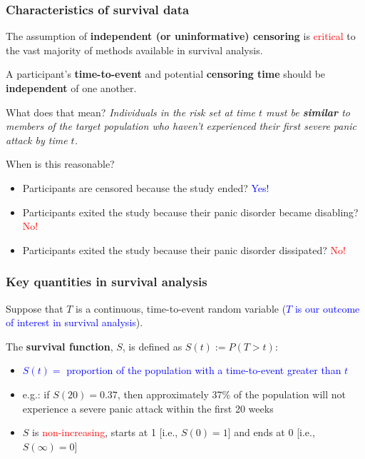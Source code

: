 \documentclass[12pt, 
hyperref={colorlinks=true, linkcolor=blue, urlcolor=cyan},dvipsnames]{beamer}
\begin{document}
\begin{frame}
\frametitle{Characteristics of survival data}
The assumption of \textbf{independent (or uninformative) censoring} is \textcolor{red}{critical} to the vast majority of methods available in survival analysis.

A participant's \textbf{time-to-event} and potential \textbf{censoring time} should be \textbf{independent} of one another.

What does that mean? \pause \textit{Individuals in the risk set at time $t$ must be \textbf{similar} to members of the target population who haven't experienced their first severe panic attack by time $t$.}

When is this reasonable? \vspace{-0.3cm}
\begin{itemize}
\item Participants are censored because the study ended? \pause \textcolor{blue}{Yes!}
\item Participants exited the study because their panic disorder became disabling? \pause \textcolor{red}{No!}
\item Participants exited the study because their panic disorder dissipated? \pause \textcolor{red}{No!}
\end{itemize}
\end{frame}

\begin{frame}
\frametitle{Key quantities in survival analysis}
Suppose that $T$ is a continuous, time-to-event random variable (\textcolor{blue}{$T$ is our outcome of interest in survival analysis}).

The \textbf{survival function}, $S$, is defined as $S(t) := P(T > t)$:
\begin{itemize}
\item \textcolor{blue}{$S(t) = $ proportion of the population with a time-to-event greater than $t$}
\item e.g.: if $S(20) = 0.37$, then approximately 37\% of the population will not experience a severe panic attack within the first 20 weeks
\item $S$ is \textcolor{red}{non-increasing}, starts at 1 [i.e., $S(0) = 1$] and ends at 0 [i.e., $S(\infty) = 0$]
\end{itemize}
\end{frame}
\end{document}
